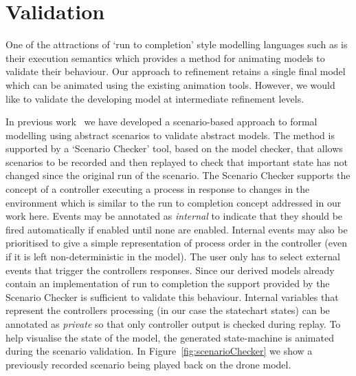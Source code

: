 

\section{Validation}
\label{sec:validation}

One of the attractions of `run to completion' style modelling languages such as \SCXML is their execution semantics which provides a method for animating models to validate their behaviour.
Our approach to \SCXML refinement retains a single \SCXML final model which can be animated using the existing \SCXML animation tools.
However, we would like to validate the developing \UMLB model at intermediate refinement levels.

In previous work~\cite{snook20JSA} we have developed a scenario-based approach to formal modelling using abstract scenarios to validate abstract models.
The method is supported by a `Scenario Checker' tool, based on the \PROB model checker, that allows scenarios to be recorded and then replayed to check that important state has not changed since the original run of the scenario.
The Scenario Checker supports the concept of a controller executing a process in response to changes in the environment which is similar to the run to completion concept addressed in our work here.
Events may be annotated as \emph{internal} to indicate that they should be fired automatically if enabled until none are enabled. 
Internal events may also be prioritised to give a simple representation of process order in the controller (even if it is left non-deterministic in the model).
The user only has to select external events that trigger the controllers responses.
Since our \SCXML derived models already contain an implementation of run to completion the support provided by the Scenario Checker is sufficient to validate this behaviour.
Internal variables that represent the controllers processing (in our case the \SCXML statechart states) can be annotated as \emph{private} so that only controller output is checked during replay.
To help visualise the state of the model, the generated \UMLB state-machine is animated during the scenario validation.
In Figure~\ref{fig:scenarioChecker} we show a previously recorded scenario being played back on the drone model.

